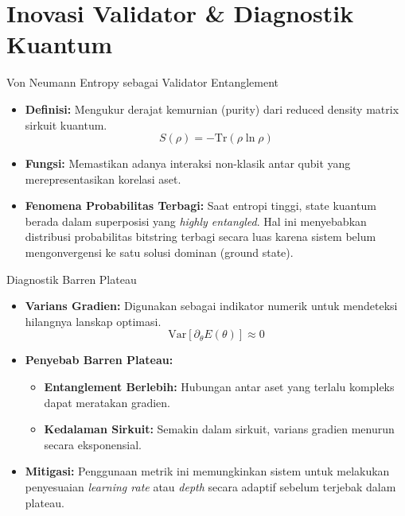\section{Inovasi Validator \& Diagnostik Kuantum}

\begin{frame}{Von Neumann Entropy sebagai Validator Entanglement}
    \begin{itemize}
        \item \textbf{Definisi:} Mengukur derajat kemurnian (purity) dari reduced density matrix sirkuit kuantum.
        \begin{equation}
            S(\rho) = -\text{Tr}(\rho \ln \rho)
        \end{equation}
        \item \textbf{Fungsi:} Memastikan adanya interaksi non-klasik antar qubit yang merepresentasikan korelasi aset.
        \item \textbf{Fenomena Probabilitas Terbagi:} Saat entropi tinggi, state kuantum berada dalam superposisi yang \textit{highly entangled}. Hal ini menyebabkan distribusi probabilitas bitstring terbagi secara luas karena sistem belum mengonvergensi ke satu solusi dominan (ground state).
    \end{itemize}
\end{frame}

\begin{frame}{Diagnostik Barren Plateau}
    \begin{itemize}
        \item \textbf{Varians Gradien:} Digunakan sebagai indikator numerik untuk mendeteksi hilangnya lanskap optimasi.
        \begin{equation}
            \text{Var}[\partial_{\theta} E(\theta)] \approx 0
        \end{equation}
        \item \textbf{Penyebab Barren Plateau:}        \begin{itemize}
            \item \textbf{Entanglement Berlebih:} Hubungan antar aset yang terlalu kompleks dapat meratakan gradien.
            \item \textbf{Kedalaman Sirkuit:} Semakin dalam sirkuit, varians gradien menurun secara eksponensial.
        \end{itemize}
        \item \textbf{Mitigasi:} Penggunaan metrik ini memungkinkan sistem untuk melakukan penyesuaian \textit{learning rate} atau \textit{depth} secara adaptif sebelum terjebak dalam plateau.
    \end{itemize}
\end{frame}
